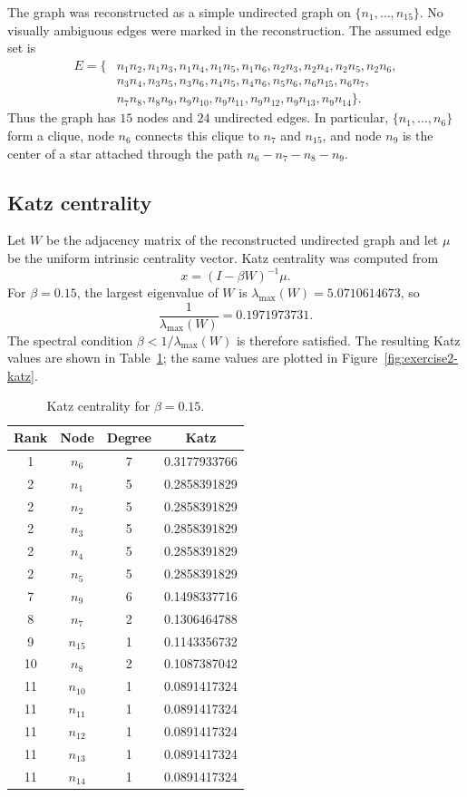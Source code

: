 \documentclass[11pt,a4paper]{article}
\begin{document}
The graph was reconstructed as a simple undirected graph on
\(\{n_1,\ldots,n_{15}\}\). No visually ambiguous edges were marked in the
reconstruction. The assumed edge set is
\[
\begin{aligned}
E=\{&
n_1n_2,n_1n_3,n_1n_4,n_1n_5,n_1n_6,
n_2n_3,n_2n_4,n_2n_5,n_2n_6,\\
&n_3n_4,n_3n_5,n_3n_6,
n_4n_5,n_4n_6,n_5n_6,
n_6n_{15},n_6n_7,\\
&n_7n_8,n_8n_9,
n_9n_{10},n_9n_{11},n_9n_{12},n_9n_{13},n_9n_{14}\}.
\end{aligned}
\]
Thus the graph has \(15\) nodes and \(24\) undirected edges. In particular,
\(\{n_1,\ldots,n_6\}\) form a clique, node \(n_6\) connects this clique to
\(n_7\) and \(n_{15}\), and node \(n_9\) is the center of a star attached
through the path \(n_6-n_7-n_8-n_9\).

\subsection*{Katz centrality}

Let \(W\) be the adjacency matrix of the reconstructed undirected graph and let
\(\mu\) be the uniform intrinsic centrality vector. Katz centrality was computed
from
\[
x=(I-\beta W)^{-1}\mu .
\]
For \(\beta=0.15\), the largest eigenvalue of \(W\) is
\(\lambda_{\max}(W)=5.0710614673\), so
\[
\frac{1}{\lambda_{\max}(W)}=0.1971973731.
\]
The spectral condition \(\beta<1/\lambda_{\max}(W)\) is therefore satisfied.
The resulting Katz values are shown in Table~\ref{tab:exercise2-katz}; the same
values are plotted in Figure~\ref{fig:exercise2-katz}.

\begin{table}[h]
\centering
\begin{tabular}{c|c|c|c}
\hline
Rank & Node & Degree & Katz\\
\hline
1 & \(n_6\) & 7 & 0.3177933766\\
2 & \(n_1\) & 5 & 0.2858391829\\
2 & \(n_2\) & 5 & 0.2858391829\\
2 & \(n_3\) & 5 & 0.2858391829\\
2 & \(n_4\) & 5 & 0.2858391829\\
2 & \(n_5\) & 5 & 0.2858391829\\
7 & \(n_9\) & 6 & 0.1498337716\\
8 & \(n_7\) & 2 & 0.1306464788\\
9 & \(n_{15}\) & 1 & 0.1143356732\\
10 & \(n_8\) & 2 & 0.1087387042\\
11 & \(n_{10}\) & 1 & 0.0891417324\\
11 & \(n_{11}\) & 1 & 0.0891417324\\
11 & \(n_{12}\) & 1 & 0.0891417324\\
11 & \(n_{13}\) & 1 & 0.0891417324\\
11 & \(n_{14}\) & 1 & 0.0891417324\\
\hline
\end{tabular}
\caption{Katz centrality for \(\beta=0.15\).}
\label{tab:exercise2-katz}
\end{table}
\end{document}
